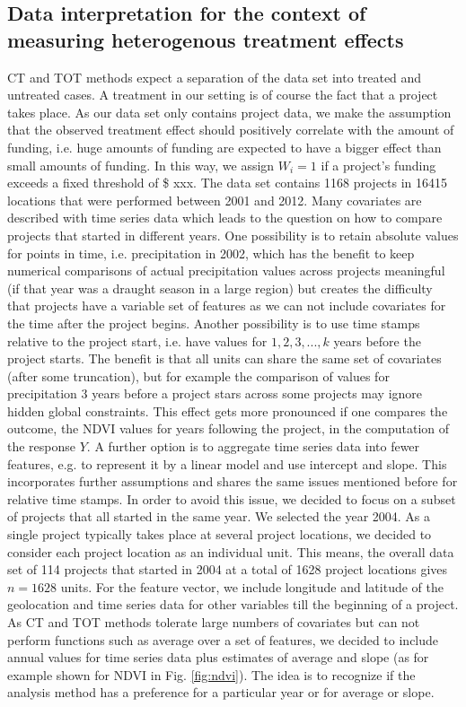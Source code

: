 \subsection{Data interpretation for the context of measuring heterogenous treatment effects}
CT and TOT methods expect a separation of the data set into treated and untreated cases.
A treatment in our setting is of course the fact that a project takes place. As our data set only contains project data, we make the assumption that the observed treatment effect should positively correlate with the amount of funding, i.e. huge amounts of funding are expected to have a bigger effect than small amounts of funding. In this way, we assign $W_i=1$ if a project's funding exceeds a fixed threshold of \$ xxx.
The data set contains 1168 projects in 16415 locations that were performed between 2001 and 2012. Many covariates are described with time series data which leads to the question on how to compare projects that started in different years. One possibility is to retain absolute values for points in time, i.e. precipitation in 2002, which has the benefit to keep numerical comparisons of actual precipitation values across projects meaningful (if that year was a draught season in a large region) but creates the difficulty that projects have a variable set of features as we can not include covariates for the time after the project begins. Another possibility is to use time stamps relative to the project start, i.e. have values for $1,2,3,...,k$ years before the project starts. The benefit is that all units can share the same set of covariates (after some truncation), but for example the comparison of values for precipitation 3 years before a project stars across some projects may ignore hidden global constraints. This effect gets more pronounced if one compares the outcome, the NDVI values for years following the project, in the computation of the response $Y$. A further option is to aggregate time series data into fewer features, e.g. to represent it by a linear model and use intercept and slope.
This incorporates further assumptions and shares the same issues mentioned before for relative time stamps. 
In order to avoid this issue, we decided to focus on a subset of projects that all started in the same year. We selected the year 2004.
As a single project typically takes place at several project locations, we decided to consider each project location as an individual unit. 
This means, the overall data set of 114 projects that started in 2004 at a total of 1628 project locations gives $n=1628$ units.
For the feature vector, we include longitude and latitude of the geolocation and time series data for other variables till the beginning of a project. As CT and TOT methods tolerate large numbers of covariates but can not perform functions such as average over a set of features, we decided to include annual values for time series data plus estimates of average and slope (as for example shown for NDVI in Fig. \ref{fig:ndvi}). The idea is to recognize if the analysis method has a preference for a particular year or for average or slope.
